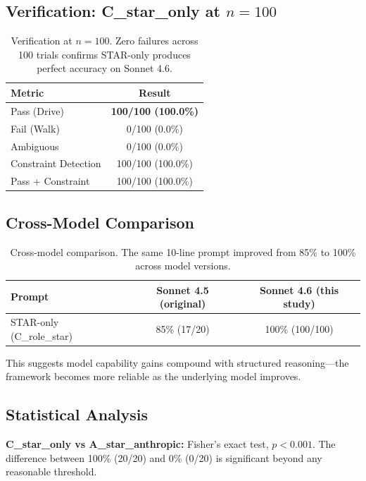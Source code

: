 \documentclass[11pt]{article}
\begin{document}
\subsection{Verification: C\_star\_only at $n=100$}

\begin{table}[H]
\centering
\begin{tabular}{lc}
\toprule
\textbf{Metric} & \textbf{Result} \\
\midrule
Pass (Drive) & \textbf{100/100 (100.0\%)} \\
Fail (Walk) & 0/100 (0.0\%) \\
Ambiguous & 0/100 (0.0\%) \\
Constraint Detection & 100/100 (100.0\%) \\
Pass + Constraint & 100/100 (100.0\%) \\
\bottomrule
\end{tabular}
\caption{Verification at $n=100$. Zero failures across 100 trials confirms STAR-only produces perfect accuracy on Sonnet 4.6.}
\label{tab:verification}
\end{table}

\subsection{Cross-Model Comparison}

\begin{table}[H]
\centering
\begin{tabular}{lcc}
\toprule
\textbf{Prompt} & \textbf{Sonnet 4.5 (original)} & \textbf{Sonnet 4.6 (this study)} \\
\midrule
STAR-only (C\_role\_star) & 85\% (17/20) & 100\% (100/100) \\
\bottomrule
\end{tabular}
\caption{Cross-model comparison. The same 10-line prompt improved from 85\% to 100\% across model versions.}
\label{tab:crossmodel}
\end{table}

This suggests model capability gains compound with structured reasoning---the framework becomes more reliable as the underlying model improves.

\subsection{Statistical Analysis}

\textbf{C\_star\_only vs A\_star\_anthropic:} Fisher's exact test, $p < 0.001$. The difference between 100\% (20/20) and 0\% (0/20) is significant beyond any reasonable threshold.
\end{document}
